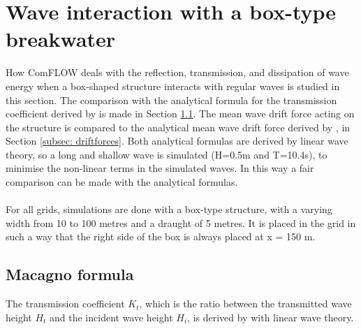 \section{Wave interaction with a box-type breakwater}
\label{sec: box-type breakwater}
How ComFLOW deals with the reflection, transmission, and dissipation of wave energy when a box-shaped
structure interacts with regular waves is studied in this section. The comparison with the analytical formula for the transmission coefficient derived by \citet{macagno1953fluid} is made in Section \ref{subsec: Macagno formula}. The mean wave drift force acting on the structure is compared to the analytical mean wave drift force derived by \parencite{longuethiggins1977}, in Section \ref{subsec: driftforces}. Both analytical formulas are derived by linear wave theory, so a long and shallow wave is simulated (H=0.5m and T=10.4s), to minimise the non-linear terms in the simulated waves. In this way a fair comparison can be made with the analytical formulas. \\
\\
For all grids, simulations are done with a box-type structure, with a varying width from 10 to 100 metres and a draught of 5 metres. It is placed in the grid in such a way that the right side of the box is always placed at x = 150 m. 



\subsection{Macagno formula}
\label{subsec: Macagno formula}
The transmission coefficient $K_t$, which is the ratio between the transmitted wave height $H_t$ and the incident wave height $H_i$, is derived by \citet{macagno1953fluid} with linear wave theory.


